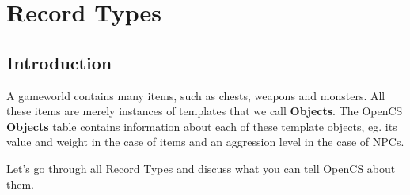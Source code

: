 \section{Record Types}

\subsection{Introduction}
A gameworld contains many items, such as chests, weapons and monsters. All these items are merely instances of templates that we call \textbf{Objects}. The OpenCS \textbf{Objects} table contains information about each of these template objects, eg. its value and weight in the case of items and an aggression level in the case of NPCs.

Let's go through all Record Types and discuss what you can tell OpenCS about them.

